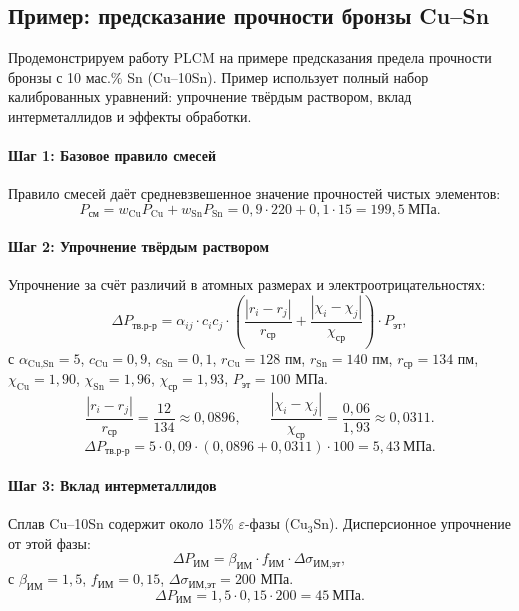 \documentclass[12pt,a4paper]{article}
\begin{document}
	
	\subsection{Пример: предсказание прочности бронзы Cu–Sn}
	\label{subsec:example-bronze}
	
	Продемонстрируем работу PLCM на примере предсказания предела прочности бронзы с 10 мас.\% Sn (Cu–10Sn). Пример использует полный набор калиброванных уравнений: упрочнение твёрдым раствором, вклад интерметаллидов и эффекты обработки.
	
	\paragraph{Шаг 1: Базовое правило смесей}
	Правило смесей даёт средневзвешенное значение прочностей чистых элементов:
	\[
	P_{\text{см}} = w_{\text{Cu}} P_{\text{Cu}} + w_{\text{Sn}} P_{\text{Sn}} = 0,9 \cdot 220 + 0,1 \cdot 15 = 199,5\ \text{МПа}.
	\]
	
	\paragraph{Шаг 2: Упрочнение твёрдым раствором}
	Упрочнение за счёт различий в атомных размерах и электроотрицательностях:
	\[
	\Delta P_{\text{тв.р-р}} = \alpha_{ij} \cdot c_i c_j \cdot \left( \frac{|r_i - r_j|}{r_{\text{ср}}} + \frac{|\chi_i - \chi_j|}{\chi_{\text{ср}}} \right) \cdot P_{\text{эт}},
	\]
	с \(\alpha_{\text{Cu,Sn}} = 5\), \(c_{\text{Cu}}=0,9\), \(c_{\text{Sn}}=0,1\), \(r_{\text{Cu}}=128\) пм, \(r_{\text{Sn}}=140\) пм, \(r_{\text{ср}}=134\) пм, \(\chi_{\text{Cu}}=1,90\), \(\chi_{\text{Sn}}=1,96\), \(\chi_{\text{ср}}=1,93\), \(P_{\text{эт}} = 100\) МПа.
	\[
	\frac{|r_i - r_j|}{r_{\text{ср}}} = \frac{12}{134} \approx 0,0896, \qquad
	\frac{|\chi_i - \chi_j|}{\chi_{\text{ср}}} = \frac{0,06}{1,93} \approx 0,0311.
	\]
	\[
	\Delta P_{\text{тв.р-р}} = 5 \cdot 0,09 \cdot (0,0896 + 0,0311) \cdot 100 = 5,43\ \text{МПа}.
	\]
	
	\paragraph{Шаг 3: Вклад интерметаллидов}
	Сплав Cu–10Sn содержит около 15\% \(\varepsilon\)-фазы (Cu\(_3\)Sn). Дисперсионное упрочнение от этой фазы:
	\[
	\Delta P_{\text{ИМ}} = \beta_{\text{ИМ}} \cdot f_{\text{ИМ}} \cdot \Delta \sigma_{\text{ИМ,эт}},
	\]
	с \(\beta_{\text{ИМ}} = 1,5\), \(f_{\text{ИМ}} = 0,15\), \(\Delta \sigma_{\text{ИМ,эт}} = 200\) МПа.
	\[
	\Delta P_{\text{ИМ}} = 1,5 \cdot 0,15 \cdot 200 = 45\ \text{МПа}.
	\]
	
\end{document}
